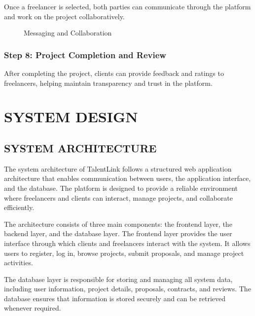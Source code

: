 \documentclass[12pt,a4paper,oneside]{report}
\numberwithin{figure}{chapter}
\numberwithin{table}{chapter}
\begin{document}
Once a freelancer is selected, both parties can communicate through the platform and work
on the project collaboratively.

\begin{figure}[H]
  \centering
  \caption{Messaging and Collaboration}
  \label{fig:messaging}
\end{figure}

\subsection{Step 8: Project Completion and Review}

After completing the project, clients can provide feedback and ratings to freelancers,
helping maintain transparency and trust in the platform.

\chapter{SYSTEM DESIGN}

\section{SYSTEM ARCHITECTURE}

The system architecture of TalentLink follows a structured web application architecture
that enables communication between users, the application interface, and the database.
The platform is designed to provide a reliable environment where freelancers and clients
can interact, manage projects, and collaborate efficiently.

\indent The architecture consists of three main components: the frontend layer, the
backend layer, and the database layer. The frontend layer provides the user interface
through which clients and freelancers interact with the system. It allows users to
register, log in, browse projects, submit proposals, and manage project activities.

\indent The database layer is responsible for storing and managing all system data,
including user information, project details, proposals, contracts, and reviews. The
database ensures that information is stored securely and can be retrieved whenever
required.
\end{document}
